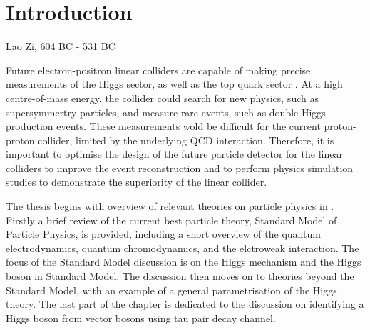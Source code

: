 \chapter{Introduction}
\label{chap:Introduction}



%
{Lao Zi, 604 BC - 531 BC}%



Future electron-positron linear colliders are capable of making precise measurements of the Higgs sector, as well as the top quark sector \cite{Brau:2007zza,Linssen:2012hp}. At a high centre-of-mass energy, the collider could search for new physics, such as supersymmertry particles, and  measure rare events, such as double Higgs production events. These measurements wold be difficult for the current proton-proton collider, limited by the underlying QCD interaction. Therefore, it is important to optimise the design of the future particle detector for the linear colliders to improve the event reconstruction and to perform physics simulation studies to demonstrate the superiority of the linear collider.



The thesis begins with overview of relevant theories on particle physics in .  Firstly a brief review of the   current best particle theory, Standard Model of Particle Physics, is provided, including a short overview of the quantum electrodynamics, quantum chromodynamics, and the elctroweak interaction. The focus of the Standard Model discussion is on the  Higgs mechanism and the Higgs boson in Standard Model. The discussion then moves on to theories beyond the Standard Model, with an example of   a general parametrisation of the Higgs theory. The last part of the chapter is dedicated to the discussion on identifying a Higgs boson from vector bosons using tau pair decay channel.


